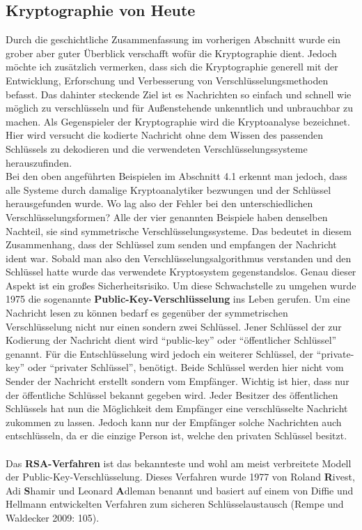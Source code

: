 \documentclass[german,12pt,a4paper]{article}
\begin{document}
\subsection{Kryptographie von Heute}
Durch die geschichtliche Zusammenfassung im vorherigen Abschnitt wurde ein grober aber guter Überblick verschafft wofür die Kryptographie dient. Jedoch möchte ich zusätzlich vermerken, dass sich die Kryptographie generell mit der Entwicklung, Erforschung und Verbesserung von Verschlüsselungsmethoden befasst. Das dahinter steckende Ziel ist es Nachrichten so einfach und schnell wie möglich zu verschlüsseln und für Außenstehende unkenntlich und unbrauchbar zu machen. Als Gegenspieler der Kryptographie wird die Kryptoanalyse bezeichnet. Hier wird versucht die kodierte Nachricht ohne dem Wissen des passenden Schlüssels zu dekodieren und die verwendeten Verschlüsselungssysteme herauszufinden.\\

Bei den oben angeführten Beispielen im Abschnitt 4.1 erkennt man jedoch, dass alle Systeme durch damalige Kryptoanalytiker bezwungen und der Schlüssel herausgefunden wurde. Wo lag also der Fehler bei den unterschiedlichen Verschlüsselungsformen? Alle der vier genannten Beispiele haben denselben Nachteil, sie sind symmetrische Verschlüsselungssysteme. Das bedeutet in diesem Zusammenhang, dass der Schlüssel zum senden und empfangen der Nachricht ident war. Sobald man also den Verschlüsselungsalgorithmus verstanden und den Schlüssel hatte wurde das verwendete Kryptosystem gegenstandslos. Genau dieser Aspekt ist ein großes Sicherheitsrisiko. Um diese Schwachstelle zu umgehen wurde 1975 die sogenannte \textbf{Public-Key-Verschlüsselung} ins Leben gerufen. Um eine Nachricht lesen zu können bedarf es gegenüber der symmetrischen Verschlüsselung nicht nur einen sondern zwei Schlüssel. Jener Schlüssel der zur Kodierung der Nachricht dient wird “public-key” oder “öffentlicher Schlüssel” genannt. Für die Entschlüsselung wird jedoch ein weiterer Schlüssel, der “private-key” oder “privater Schlüssel”, benötigt. Beide Schlüssel werden hier nicht vom Sender der Nachricht erstellt sondern vom Empfänger. Wichtig ist hier, dass nur der öffentliche Schlüssel bekannt gegeben wird. Jeder Besitzer des öffentlichen Schlüssels hat nun die Möglichkeit dem Empfänger eine verschlüsselte Nachricht zukommen zu lassen. Jedoch kann nur der Empfänger solche Nachrichten auch entschlüsseln, da er die einzige Person ist, welche den privaten Schlüssel besitzt.\\\\
Das \textbf{RSA-Verfahren} ist das bekannteste und wohl am meist verbreitete Modell der Public-Key-Verschlüsselung. Dieses Verfahren wurde 1977 von Roland \textbf{R}ivest, Adi \textbf{S}hamir und Leonard \textbf{A}dleman benannt und basiert auf einem von Diffie und Hellmann entwickelten Verfahren zum sicheren Schlüsselaustausch (Rempe und Waldecker 2009: 105).
\end{document}
